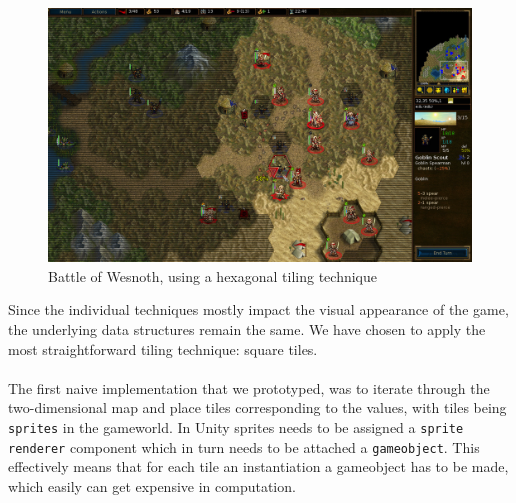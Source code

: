 \begin{figure}[H]
    \centering
    \includegraphics[scale=0.4]{figures/generating_levels/wesnoth_hex.png}
    \caption{Battle of Wesnoth, using a hexagonal tiling technique}\label{fig:wesnoth_hex} 
\end{figure}
Since the individual techniques mostly impact the visual appearance of the game, the underlying data structures remain the same.
We have chosen to apply the most straightforward tiling technique: square tiles.
\\
\\
The first naive implementation that we prototyped, was to iterate through the two-dimensional map and place tiles corresponding to the values, with tiles being \texttt{sprites} in the gameworld. 
In Unity sprites needs to be assigned a \texttt{sprite renderer} component which in turn needs to be attached a \texttt{gameobject}. 
This effectively means that for each tile an instantiation a gameobject has to be made, which easily can get expensive in computation.

